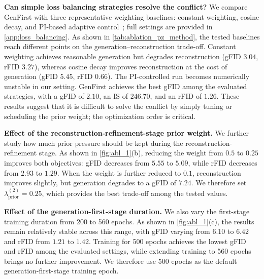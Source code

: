 \documentclass[]{bytedance_seed}
\begin{document}
\textbf{Can simple loss balancing strategies resolve the conflict?}
We compare GenFirst with three representative weighting baselines: constant weighting, cosine decay, and PI-based adaptive control~\cite{shao2020controlvae}; full settings are provided in \cref{app:loss_balancing}. 
As shown in \cref{tab:ablation_pz_method}, the tested baselines reach different points on the generation--reconstruction trade-off. 
Constant weighting achieves reasonable generation but degrades reconstruction (gFID $3.04$, rFID $3.27$), whereas cosine decay improves reconstruction at the cost of generation (gFID $5.45$, rFID $0.66$).
The PI-controlled run becomes numerically unstable in our setting. 
GenFirst achieves the best gFID among the evaluated strategies, with a gFID of $2.10$, an IS of $246.70$, and an rFID of $1.26$.
These results suggest that it is difficult to solve the conflict by simply tuning or scheduling the prior weight; the optimization order is critical.

\textbf{Effect of the reconstruction-refinement-stage prior weight.}
We further study how much prior pressure should be kept during the reconstruction-refinement stage.
As shown in \cref{fig:abl_1}(b), reducing the weight from $0.5$ to $0.25$ improves both objectives: gFID decreases from $5.55$ to $5.09$, while rFID decreases from $2.93$ to $1.29$.
When the weight is further reduced to $0.1$, reconstruction improves slightly, but generation degrades to a gFID of $7.24$.
We therefore set $\lambda_{\mathrm{prior}}^{(2)}=0.25$, which provides the best trade-off among the tested values.

\textbf{Effect of the generation-first-stage duration.}
We also vary the first-stage training duration from 200 to 560 epochs.
As shown in \cref{fig:abl_1}(c), the results remain relatively stable across this range, with gFID varying from $6.10$ to $6.42$ and rFID from $1.21$ to $1.42$.
Training for 500 epochs achieves the lowest gFID and rFID among the evaluated settings, while extending training to 560 epochs brings no further improvement.
We therefore use 500 epochs as the default generation-first-stage training epoch.
\end{document}
